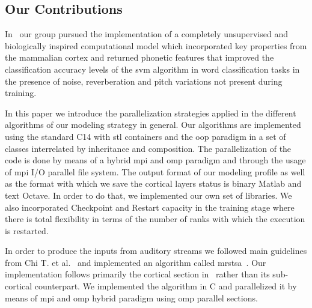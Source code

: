 \documentclass[10pt,journal,compsoc]{IEEEtran}
\newcommand{\CC}{C\nolinebreak\hspace{-.05em}\raisebox{.4ex}{\tiny\bf +}\nolinebreak\hspace{-.10em}\raisebox{.4ex}{\tiny\bf +}}
\begin{document}




\subsection{Our Contributions}


In~\cite{Dematties2018} our group pursued the implementation of a completely unsupervised and biologically inspired computational model which incorporated key properties from the mammalian cortex and returned phonetic features that improved the classification accuracy levels of the \gls{svm} algorithm in word classification tasks in the presence of noise, reverberation and pitch variations not present during training.

In this paper we introduce the parallelization strategies applied in the different algorithms of our modeling strategy in general. Our algorithms are implemented using the standard \CC14 with \gls{stl} containers and the \gls{oop} paradigm in a set of classes interrelated by inheritance and composition. The parallelization of the code is done by means of a hybrid \gls{mpi} and \gls{omp} paradigm and through the usage of \gls{mpi} I/O parallel file system. The output format of our modeling profile as well as the format with which we save the cortical layers status is binary Matlab and text Octave. In order to do that, we implemented our own set of libraries. We also incorporated Checkpoint and Restart capacity in the training stage where there is total flexibility in terms of the number of ranks with which the execution is restarted.

In order to produce the inputs from auditory streams we followed main guidelines from Chi T. et al.~\cite{chi_2005} and implemented an algorithm called \gls{mrstsa}~\cite{Dematties2018}. Our implementation follows primarily the cortical section in~\cite{chi_2005} rather than its sub-cortical counterpart. We implemented the algorithm in C and parallelized it by means of \gls{mpi} and \gls{omp} hybrid paradigm using \gls{omp} parallel sections.
\end{document}
